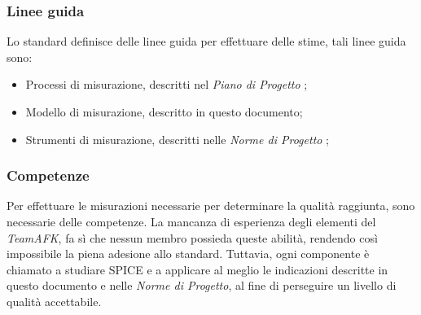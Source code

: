 \subsubsection{Linee guida}
Lo standard definisce delle linee guida per effettuare delle stime, tali linee guida sono:
\begin{itemize}
	\item Processi di misurazione, descritti nel \textit{Piano di Progetto} ;
	\item Modello di misurazione, descritto in questo documento;
	\item Strumenti di misurazione, descritti nelle \textit{Norme di Progetto} ;
\end{itemize}

\subsubsection{Competenze}
Per effettuare le misurazioni necessarie per determinare la qualità raggiunta, sono necessarie delle competenze. La mancanza di esperienza degli elementi del \textit{TeamAFK}, fa sì che nessun membro possieda queste abilità, rendendo così impossibile la piena adesione allo standard. Tuttavia, ogni componente è chiamato a studiare SPICE e a applicare al meglio le indicazioni descritte in questo documento e nelle \textit{Norme di Progetto}, al fine di perseguire un livello di qualità accettabile.






